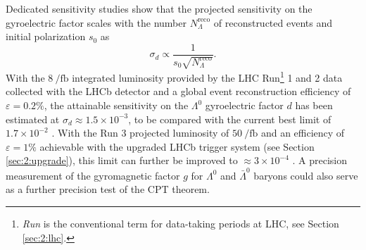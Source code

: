 Dedicated sensitivity studies \cite{EMDipoleSearch} show that the projected sensitivity on the \lz gyroelectric factor scales with the number $N_\Lambda^\text{reco}$ of reconstructed \demonstratorshort events and initial polarization $s_0$ as
\begin{equation}
\sigma_d \propto \frac{1}{s_0 \sqrt{N_\Lambda^\text{reco}}}.
\end{equation}
With the $8~\si{\per\femto\barn}$ integrated luminosity provided by the LHC Run\footnote{\textit{Run} is the conventional term for data-taking periods at LHC, see Section \ref{sec:2:lhc}.} 1 and 2 data collected with the LHCb detector and a global event reconstruction efficiency of $\varepsilon = 0.2\%$, the attainable sensitivity on the $\Lambda^0$ gyroelectric factor $d$ has been estimated at $\sigma_d \approx 1.5\times {10}^{-3}$, to be compared with the current best limit of $1.7 \times {10}^{-2}$ \cite{PhysRevD.23.814}.
With the Run 3 projected luminosity of $\SI{50}{\per\femto\barn}$ and an efficiency of $\varepsilon = 1\%$ achievable with the upgraded LHCb trigger system (see Section \ref{sec:2:upgrade}), this limit can further be improved to $\approx 3\times {10}^{-4}$ \cite{EMDipoleSearch}.
A precision measurement of the gyromagnetic factor $g$ for $\Lambda^0$ and $\bar{\Lambda}^0$ baryons could also serve as a further precision test of the CPT theorem.


